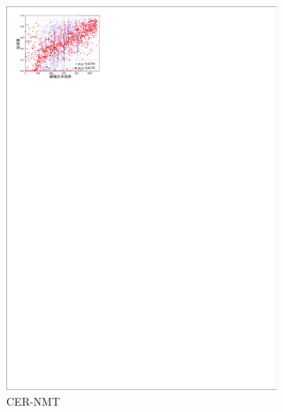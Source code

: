 \begin{figure}[!htbp]
\begin{subfigure}[b]{0.45\textwidth}
      \includegraphics[width=\textwidth]{Img/fig_4_fidelity_cer_baseorder.pdf}
      \caption{CER-NMT}
      \label{fig:4_fidelity_cer_baseorder}
    \end{subfigure}
    \\%
    \begin{subfigure}[b]{0.45\textwidth}

\end{subfigure}
\end{figure}

